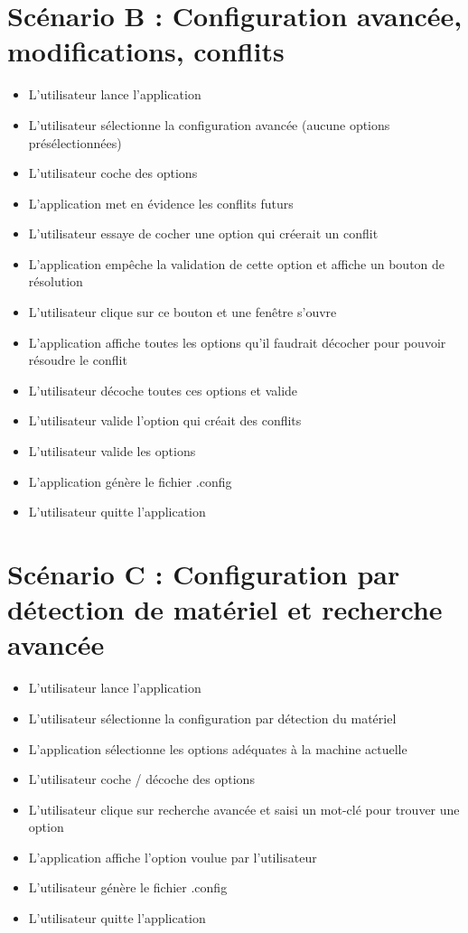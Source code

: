 \documentclass[16pts]{report}
\begin{document}
\section{Scénario B : Configuration avancée, modifications, conflits}
\label{sec:Scénario B : Configuration avancée, modifications, conflits}

\begin{itemize}
    \item L'utilisateur lance l'application
    \item L'utilisateur sélectionne la configuration avancée (aucune options
        présélectionnées)
    \item L'utilisateur coche des options
    \item L'application met en évidence les conflits futurs
    \item L'utilisateur essaye de cocher une option qui créerait un conflit
    \item L'application empêche la validation de cette option et affiche un
        bouton de résolution
    \item L'utilisateur clique sur ce bouton et une fenêtre s'ouvre
    \item L'application affiche toutes les options qu'il faudrait décocher pour
        pouvoir résoudre le conflit
    \item L'utilisateur décoche toutes ces options et valide
    \item L'utilisateur valide l'option qui créait des conflits
    \item L'utilisateur valide les options
    \item L'application génère le fichier .config
    \item L'utilisateur quitte l'application
\end{itemize}

\pagebreak

\section{Scénario C : Configuration par détection de matériel et recherche avancée}
\label{sec:Scénario C : Configuration par détection de matériel et recherche avancée}

\begin{itemize}
    \item L'utilisateur lance l'application
    \item L'utilisateur sélectionne la configuration par détection du matériel
    \item L'application sélectionne les options adéquates à la machine actuelle
    \item L'utilisateur coche / décoche des options
    \item L'utilisateur clique sur recherche avancée et saisi un mot-clé pour
        trouver une option
    \item L'application affiche l'option voulue par l'utilisateur
    \item L'utilisateur génère le fichier .config
    \item L'utilisateur quitte l'application
\end{itemize}
\end{document}
